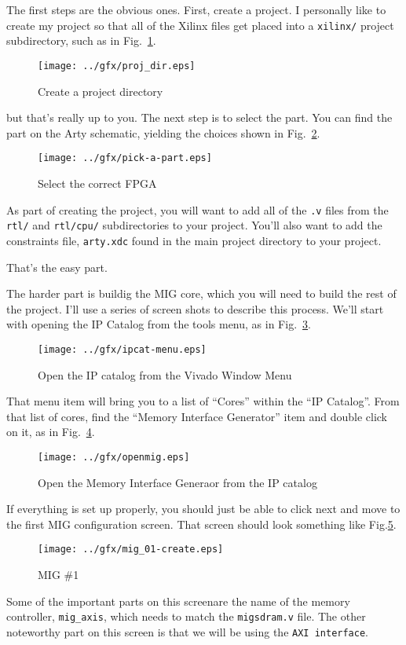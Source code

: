 \documentclass{gqtekspec}
\begin{document}
The first steps are the obvious ones.  First, create a project.  I personally
like to create my project so that all of the Xilinx files get placed into a 
{\tt xilinx/} project subdirectory, such as in Fig.~\ref{fig:proj_dir}.
\begin{figure}\begin{center}
\texttt{[image: ../gfx/proj\_dir.eps]}
\caption{Create a project directory}\label{fig:proj_dir}
\end{center}\end{figure}
but that's really up to you.  The next step is to select the part.  You can
find the part on the Arty schematic, yielding the choices shown in Fig.~\ref{fig:pick-a-part}.
\begin{figure}\begin{center}
\texttt{[image: ../gfx/pick-a-part.eps]}
\caption{Select the correct FPGA}\label{fig:pick-a-part}
\end{center}\end{figure}
As part of
creating the project, you will want to add all of the {\tt *.v} files from the
{\tt rtl/} and {\tt rtl/cpu/} subdirectories to your project.  You'll also want
to add the constraints file, {\tt arty.xdc} found in the main project directory
to your project.

That's the easy part.

The harder part is buildig the MIG core, which you will need to build the rest
of the project.  I'll use a series of screen shots to describe this process.
We'll start with opening the IP Catalog from the tools menu, as in
Fig.~\ref{fig:ipcat-menu}.
\begin{figure}\begin{center}
\texttt{[image: ../gfx/ipcat-menu.eps]}
\caption{Open the IP catalog from the Vivado Window Menu}\label{fig:ipcat-menu}
\end{center}\end{figure}
That menu item will bring you to a list of ``Cores'' within the ``IP Catalog''.
From that list of cores, find the ``Memory Interface Generator'' item and double
click on it, as in Fig.~\ref{fig:openmig}. 
\begin{figure}\begin{center}
\texttt{[image: ../gfx/openmig.eps]}
\caption{Open the Memory Interface Generaor from the IP catalog}\label{fig:openmig}
\end{center}\end{figure}
If everything is set up properly, you should just be able to click next and
move to the first MIG configuration screen.  That screen should look something
like Fig.\ref{fig:mig_create}.
\begin{figure}\begin{center}
\texttt{[image: ../gfx/mig\_01-create.eps]}
\caption{MIG \#1}\label{fig:mig_create}
\end{center}\end{figure}
Some of the important parts on this screenare the name of the memory controller,
{\tt mig\_axis}, which needs to match the {\tt migsdram.v} file.  The other
noteworthy part on this screen is that we will be using the {\tt AXI interface}.
%
\end{document}
